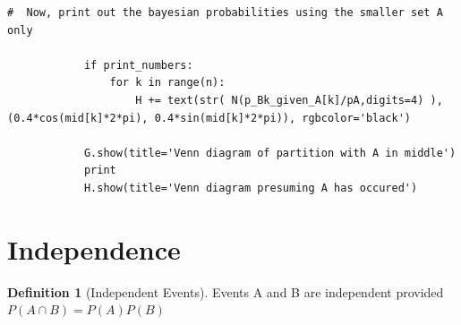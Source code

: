 \documentclass[10pt,]{book}
\theoremstyle{plain}
\theoremstyle{definition}
\newtheorem{definition}[theorem]{Definition}
\theoremstyle{definition}
\numberwithin{equation}{section}
\begin{document}
\begin{lstlisting}[style=sageinput]
        #  Now, print out the bayesian probabilities using the smaller set A only
    
            if print_numbers:
                for k in range(n):
                    H += text(str( N(p_Bk_given_A[k]/pA,digits=4) ),(0.4*cos(mid[k]*2*pi), 0.4*sin(mid[k]*2*pi)), rgbcolor='black')
                    
            G.show(title='Venn diagram of partition with A in middle')
            print
            H.show(title='Venn diagram presuming A has occured')
\end{lstlisting}
\typeout{************************************************}
\typeout{************************************************}
\section[Independence]{Independence}\label{section-21}
\begin{definition}[Independent Events]\label{definition-24}
Events A and B are independent provided \(P(A \cap B) = P(A) P(B)\)\end{definition}
\typeout{************************************************}
\typeout{************************************************}
\end{document}
